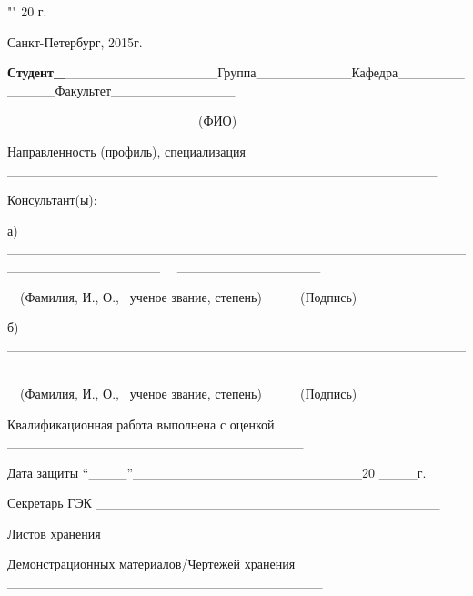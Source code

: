 \documentclass[14pt,a4paper]{report}
\begin{document}
\begin{flushright}
    \bigskip
    
    "\underline{\hspace{0.5cm}}" \underline{\hspace{4cm}} 20 \underline{\hspace{1cm}}г. \hspace{0.3cm}
    
\end{flushright}

 \vspace{2.5cm}

{\centering
Санкт-Петербург, 2015г. \par}

\textbf{Студент\_}\_\_\_\_\_\_\_\_\_\_\_\_\_\_\_\_Группа\_\_\_\_\_\_\_\_\_\_Кафедра\_\_\_\_\_\_\_\_\_\_\_\_Факультет\_\_\_\_\_\_\_\_\_\_\_\_\_

\ \ \ \ \ \ \ \ \ \ \ \ \ \ \ \ \ \ \ \ \ \ \ \ \ \ \ \ \ \ (ФИО)


\bigskip

Направленность (профиль), специализация
\_\_\_\_\_\_\_\_\_\_\_\_\_\_\_\_\_\_\_\_\_\_\_\_\_\_\_\_\_\_\_\_\_\_\_\_\_\_\_\_\_\_\_\_\_


\bigskip

Консультант(ы):

а)
\_\_\_\_\_\_\_\_\_\_\_\_\_\_\_\_\_\_\_\_\_\_\_\_\_\_\_\_\_\_\_\_\_\_\_\_\_\_\_\_\_\_\_\_\_\_\_\_\_\_\_\_\_\_\_\_\_\_\_\_\_\_\_\_
\ \ \_\_\_\_\_\_\_\_\_\_\_\_\_\_\_

\ \ (Фамилия, И., О., \ ученое звание, степень)\ \ \ \ \ \ (Подпись)


\bigskip

б)
\_\_\_\_\_\_\_\_\_\_\_\_\_\_\_\_\_\_\_\_\_\_\_\_\_\_\_\_\_\_\_\_\_\_\_\_\_\_\_\_\_\_\_\_\_\_\_\_\_\_\_\_\_\_\_\_\_\_\_\_\_\_\_\_
\ \ \_\_\_\_\_\_\_\_\_\_\_\_\_\_\_

\ \ (Фамилия, И., О., \ ученое звание, степень)\ \ \ \ \ \ (Подпись)


\bigskip


\bigskip


\bigskip


\bigskip

Квалификационная работа выполнена с оценкой \_\_\_\_\_\_\_\_\_\_\_\_\_\_\_\_\_\_\_\_\_\_\_\_\_\_\_\_\_\_\_


\bigskip


\bigskip

Дата защиты “\_\_\_\_”\_\_\_\_\_\_\_\_\_\_\_\_\_\_\_\_\_\_\_\_\_\_\_\_20 \_\_\_\_г.


\bigskip


\bigskip

Секретарь ГЭК \_\_\_\_\_\_\_\_\_\_\_\_\_\_\_\_\_\_\_\_\_\_\_\_\_\_\_\_\_\_\_\_\_\_\_\_


\bigskip


\bigskip

Листов хранения \_\_\_\_\_\_\_\_\_\_\_\_\_\_\_\_\_\_\_\_\_\_\_\_\_\_\_\_\_\_\_\_\_\_\_


\bigskip


\bigskip

Демонстрационных материалов/Чертежей хранения \_\_\_\_\_\_\_\_\_\_\_\_\_\_\_\_\_\_\_\_\_\_\_\_\_\_\_\_\_\_\_\_\_


\bigskip
\end{document}
